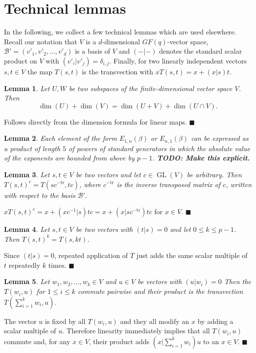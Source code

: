 \documentclass[a4paper,11pt]{article}
\def\GL{\operatorname{GL}}
\newcommand{\fixme}[1]{\textbf{#1}}
\newcommand{\tr}{\mathrm{tr}}
\newcommand{\proofend}{\hfill$\blacksquare$}
\newcommand{\B}{\mathcal{B}}
\newtheorem{lemma}{Lemma}
\begin{document}
\section{Technical lemmas}

In the following, we collect a few technical lemmas which are used
elsewhere. Recall our notation that $V$ is a $d$-dimensional $GF(q)$-vector
space, $\B' = (v'_1, v'_2, \ldots, v'_d)$ is a basis of $V$ and
$(-|-)$ denotes the standard scalar product on $V$ with $(v'_i|v'_j) =
\delta_{i,j}$. Finally, for two linearly independent vectors $s,t \in V$ the
map $T(s,t)$ is the transvection with $xT(s,t) = x + (x|s)t$.

\begin{lemma}
\label{dimformula}
Let $U,W$ be two subspaces of the finite-dimensional vector space $V$.
Then
\[ \dim (U) + \dim (V) = \dim(U+V) + \dim(U \cap V). \]
\end{lemma}
\proof Follows directly from the dimension formula for linear maps.
\proofend

\begin{lemma}
\label{transvecs}
Each element of the form $E_{1,n}(\beta)$ or $E_{n,1}(\beta)$ can be
expressed as a product of length $5$ of powers of standard generators
in which the absolute value of the exponents are bounded from above 
by $p-1$. \fixme{TODO: Make this explicit.}
\end{lemma}

\begin{lemma}
\label{conjtransv}
Let $s,t \in V$ be two vectors and let $c \in \GL(V)$ be arbitrary. 
Then $T(s,t)^c = T(sc^{-\tr},tc)$,
where $c^{-\tr}$ is the inverse transposed matrix of $c$, written
with respect to the basis $\B'$.
\end{lemma}
\proof
$xT(s,t)^c = x + (xc^{-1}|s)tc = x + (x|sc^{-\tr})tc$ for $x \in V$. 
\proofend

\begin{lemma}
\label{powertrans}
Let $s,t \in V$ be two vectors with $(t|s)=0$ and let 
$0 \le k \le p-1$. Then $T(s,t)^k = T(s,kt)$.
\end{lemma}
\proof Since $(t|s)=0$, repeated application of $T$ just adds the same
scalar multiple of $t$ repeatedly $k$ times.
\proofend

\begin{lemma}
\label{lincombtrans}
Let $w_1, w_2, \ldots, w_k \in V$ and $u \in V$ be vectors with 
$(u|w_i)=0$
Then the $T(w_i,u)$ for $1 \le i \le k$ commute pairwise and their 
product is the transvection $T(\sum_{i=1}^k w_i,u)$.
\end{lemma}
\proof The vector $u$ is fixed by all $T(w_i,u)$ and they all modify
an $x$ by adding a scalar multiple of $u$. Therefore linearity
immediately implies that all $T(w_i,u)$ commute and, for any $x \in V$,
their product adds
$(x|\sum_{i=1}^k w_i)u$ to an $x \in V$.
\proofend
\end{document}
